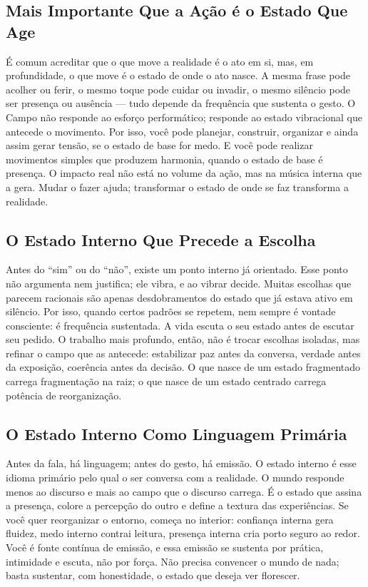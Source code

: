 \documentclass[12pt]{book}
\begin{document}
\subsection*{Mais Importante Que a Ação é o Estado Que Age}

É comum acreditar que o que move a realidade é o ato em si, mas, em profundidade, o que move é o estado de onde o ato nasce. A mesma frase pode acolher ou ferir, o mesmo toque pode cuidar ou invadir, o mesmo silêncio pode ser presença ou ausência — tudo depende da frequência que sustenta o gesto. O Campo não responde ao esforço performático; responde ao estado vibracional que antecede o movimento. Por isso, você pode planejar, construir, organizar e ainda assim gerar tensão, se o estado de base for medo. E você pode realizar movimentos simples que produzem harmonia, quando o estado de base é presença. O impacto real não está no volume da ação, mas na música interna que a gera. Mudar o fazer ajuda; transformar o estado de onde se faz transforma a realidade.

\subsection*{O Estado Interno Que Precede a Escolha}

Antes do \enquote{sim} ou do \enquote{não}, existe um ponto interno já orientado. Esse ponto não argumenta nem justifica; ele vibra, e ao vibrar decide. Muitas escolhas que parecem racionais são apenas desdobramentos do estado que já estava ativo em silêncio. Por isso, quando certos padrões se repetem, nem sempre é vontade consciente: é frequência sustentada. A vida escuta o seu estado antes de escutar seu pedido. O trabalho mais profundo, então, não é trocar escolhas isoladas, mas refinar o campo que as antecede: estabilizar paz antes da conversa, verdade antes da exposição, coerência antes da decisão. O que nasce de um estado fragmentado carrega fragmentação na raiz; o que nasce de um estado centrado carrega potência de reorganização.

\subsection*{O Estado Interno Como Linguagem Primária}

Antes da fala, há linguagem; antes do gesto, há emissão. O estado interno é esse idioma primário pelo qual o ser conversa com a realidade. O mundo responde menos ao discurso e mais ao campo que o discurso carrega. É o estado que assina a presença, colore a percepção do outro e define a textura das experiências. Se você quer reorganizar o entorno, começa no interior: confiança interna gera fluidez, medo interno contrai leitura, presença interna cria porto seguro ao redor. Você é fonte contínua de emissão, e essa emissão se sustenta por prática, intimidade e escuta, não por força. Não precisa convencer o mundo de nada; basta sustentar, com honestidade, o estado que deseja ver florescer.
\end{document}

